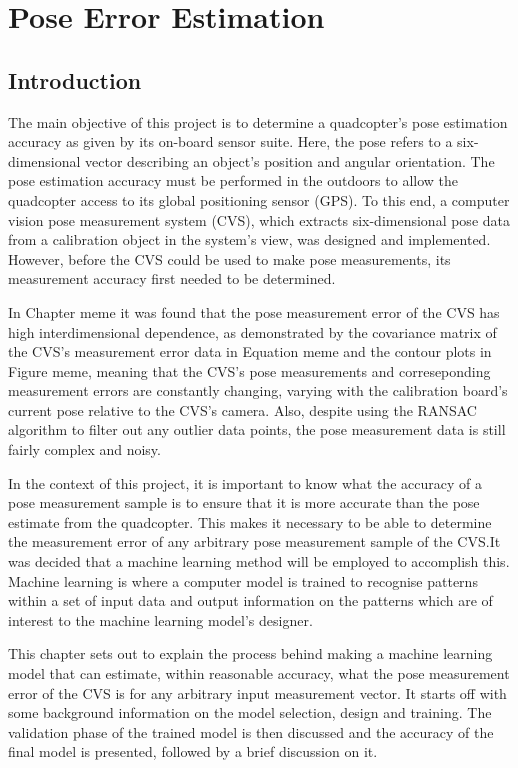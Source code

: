 \chapter{Pose Error Estimation}

\section{Introduction}

The main objective of this project is to determine a quadcopter's pose estimation accuracy as given by its on-board sensor suite. Here, the pose refers to a six-dimensional vector describing an object's position and angular orientation. The pose estimation accuracy must be performed in the outdoors to allow the quadcopter access to its global positioning sensor (GPS). To this end, a computer vision pose measurement system (CVS), which extracts six-dimensional pose data from a calibration object in the system's view, was designed and implemented. However, before the CVS could be used to make pose measurements, its measurement accuracy first needed to be determined. 

In Chapter meme it was found that the pose measurement error of the CVS has high interdimensional dependence, as demonstrated by the covariance matrix of the CVS's measurement error data in Equation meme and the contour plots in Figure meme, meaning that the CVS's pose measurements and correseponding measurement errors are constantly changing, varying with the calibration board's current pose relative to the CVS's camera. Also, despite using the RANSAC algorithm to filter out any outlier data points, the pose measurement data is still fairly complex and noisy.

In the context of this project, it is important to know what the accuracy of a pose measurement sample is to ensure that it is more accurate than the pose estimate from the quadcopter. This makes it necessary to be able to determine the measurement error of any arbitrary pose measurement sample of the CVS.\@ It was decided that a machine learning method will be employed to accomplish this. Machine learning is where a computer model is trained to recognise patterns within a set of input data and output information on the patterns which are of interest to the machine learning model's designer. 

This chapter sets out to explain the process behind making a machine learning model that can estimate, within reasonable accuracy, what the pose measurement error of the CVS is for any arbitrary input measurement vector. It starts off with some background information on the model selection, design and training. The validation phase of the trained model is then discussed and the accuracy of the final model is presented, followed by a brief discussion on it. 

